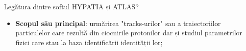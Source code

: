 \documentclass{beamer}
\begin{document}

\begin{frame}{Legătura dintre softul HYPATIA și ATLAS?}

\vspace{-4cm}

 \begin{itemize}
    
 \item[\ding{43}]{\makebox[0.5cm]{} \textbf{Scopul său principal}: urmărirea "tracks-urilor" sau a traiectoriilor particulelor care rezultă din ciocnirile protonilor dar și studiul parametrilor fizici care stau la baza identificării identității lor;}

\end{itemize}      




\end{frame}
\end{document}
